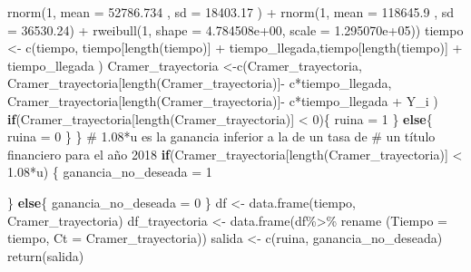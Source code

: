 \documentclass[
  us-letterpaper,
]{scrreprt}
\newenvironment{Shaded}{\begin{snugshade}}{\end{snugshade}}
\newcommand{\AttributeTok}[1]{\textcolor[rgb]{0.40,0.45,0.13}{#1}}
\newcommand{\CommentTok}[1]{\textcolor[rgb]{0.37,0.37,0.37}{#1}}
\newcommand{\ControlFlowTok}[1]{\textcolor[rgb]{0.00,0.23,0.31}{\textbf{#1}}}
\newcommand{\DecValTok}[1]{\textcolor[rgb]{0.68,0.00,0.00}{#1}}
\newcommand{\FloatTok}[1]{\textcolor[rgb]{0.68,0.00,0.00}{#1}}
\newcommand{\FunctionTok}[1]{\textcolor[rgb]{0.28,0.35,0.67}{#1}}
\newcommand{\NormalTok}[1]{\textcolor[rgb]{0.00,0.23,0.31}{#1}}
\newcommand{\OtherTok}[1]{\textcolor[rgb]{0.00,0.23,0.31}{#1}}
\newcommand{\SpecialCharTok}[1]{\textcolor[rgb]{0.37,0.37,0.37}{#1}}
\theoremstyle{plain}
\theoremstyle{plain}
\theoremstyle{definition}
\theoremstyle{remark}
\begin{document}
\begin{Shaded}
\begin{Highlighting}[]
             \FunctionTok{rnorm}\NormalTok{(}\DecValTok{1}\NormalTok{, }\AttributeTok{mean =} \FloatTok{52786.734}\NormalTok{  , }\AttributeTok{sd =} \FloatTok{18403.17}\NormalTok{ ) }\SpecialCharTok{+}
             \FunctionTok{rnorm}\NormalTok{(}\DecValTok{1}\NormalTok{, }\AttributeTok{mean =} \FloatTok{118645.9}\NormalTok{  , }\AttributeTok{sd =} \FloatTok{36530.24}\NormalTok{)   }\SpecialCharTok{+} 
             \FunctionTok{rweibull}\NormalTok{(}\DecValTok{1}\NormalTok{,  }\AttributeTok{shape =} \FloatTok{4.784508e+00}\NormalTok{, }\AttributeTok{scale =} \FloatTok{1.295070e+05}\NormalTok{)) }
\NormalTok{    tiempo }\OtherTok{\textless{}{-}} \FunctionTok{c}\NormalTok{(tiempo, tiempo[}\FunctionTok{length}\NormalTok{(tiempo)] }\SpecialCharTok{+}
\NormalTok{                  tiempo\_llegada,tiempo[}\FunctionTok{length}\NormalTok{(tiempo)] }\SpecialCharTok{+} 
\NormalTok{                  tiempo\_llegada ) }
\NormalTok{    Cramer\_trayectoria }\OtherTok{\textless{}{-}}\FunctionTok{c}\NormalTok{(Cramer\_trayectoria,}
\NormalTok{                Cramer\_trayectoria[}\FunctionTok{length}\NormalTok{(Cramer\_trayectoria)]}\SpecialCharTok{{-}}
\NormalTok{                             c}\SpecialCharTok{*}\NormalTok{tiempo\_llegada,}
\NormalTok{                Cramer\_trayectoria[}\FunctionTok{length}\NormalTok{(Cramer\_trayectoria)]}\SpecialCharTok{{-}}
\NormalTok{                             c}\SpecialCharTok{*}\NormalTok{tiempo\_llegada }\SpecialCharTok{+}\NormalTok{  Y\_i )}
    \ControlFlowTok{if}\NormalTok{(Cramer\_trayectoria[}\FunctionTok{length}\NormalTok{(Cramer\_trayectoria)] }\SpecialCharTok{\textless{}} \DecValTok{0}\NormalTok{)\{}
\NormalTok{      ruina }\OtherTok{=} \DecValTok{1}
\NormalTok{    \}}
    \ControlFlowTok{else}\NormalTok{\{}
\NormalTok{      ruina }\OtherTok{=} \DecValTok{0}
\NormalTok{    \}}
\NormalTok{  \}}
\CommentTok{\# 1.08*u es la ganancia inferior a la de un tasa de}
\CommentTok{\# un título financiero para el año 2018}
  \ControlFlowTok{if}\NormalTok{(Cramer\_trayectoria[}\FunctionTok{length}\NormalTok{(Cramer\_trayectoria)] }\SpecialCharTok{\textless{}} \FloatTok{1.08}\SpecialCharTok{*}\NormalTok{u) \{}
\NormalTok{    ganancia\_no\_deseada }\OtherTok{=} \DecValTok{1}
    
\NormalTok{  \} }
  \ControlFlowTok{else}\NormalTok{\{}
\NormalTok{    ganancia\_no\_deseada }\OtherTok{=} \DecValTok{0}
\NormalTok{  \}}
\NormalTok{  df }\OtherTok{\textless{}{-}} \FunctionTok{data.frame}\NormalTok{(tiempo, Cramer\_trayectoria)}
\NormalTok{  df\_trayectoria }\OtherTok{\textless{}{-}} \FunctionTok{data.frame}\NormalTok{(df}\SpecialCharTok{\%\textgreater{}\%}\NormalTok{ rename}
\NormalTok{                               (}\AttributeTok{Tiempo =}\NormalTok{ tiempo, }
                                 \AttributeTok{Ct =}\NormalTok{ Cramer\_trayectoria))}
\NormalTok{  salida }\OtherTok{\textless{}{-}} \FunctionTok{c}\NormalTok{(ruina, ganancia\_no\_deseada)}
  \FunctionTok{return}\NormalTok{(salida)}
  

\end{Highlighting}
\end{Shaded}
\end{document}
